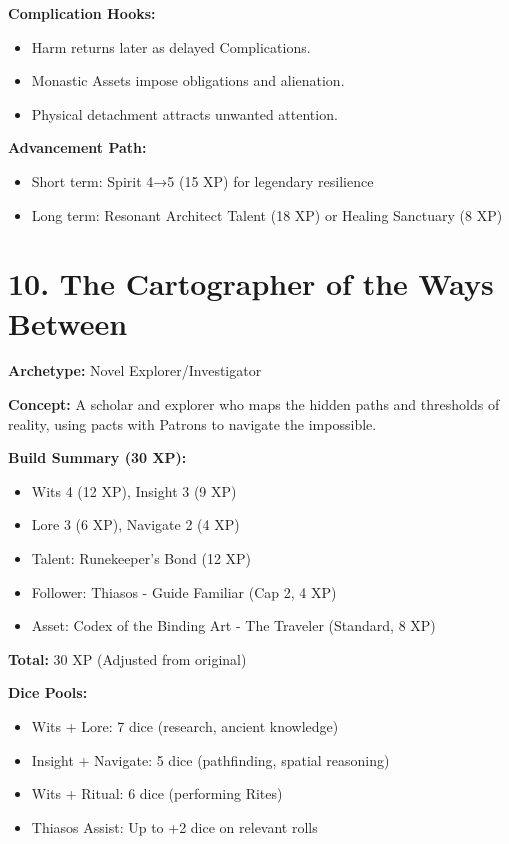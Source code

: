 \textbf{Complication Hooks:}
\begin{itemize}
  \item Harm returns later as delayed Complications.
  \item Monastic Assets impose obligations and alienation.
  \item Physical detachment attracts unwanted attention.
\end{itemize}

\textbf{Advancement Path:}
\begin{itemize}
  \item Short term: Spirit 4→5 (15 XP) for legendary resilience
  \item Long term: Resonant Architect Talent (18 XP) or Healing Sanctuary (8 XP)
\end{itemize}

\section{10. The Cartographer of the Ways Between}
\textbf{Archetype:} Novel Explorer/Investigator

\textbf{Concept:} A scholar and explorer who maps the hidden paths and thresholds of reality, using pacts with Patrons to navigate the impossible.

\textbf{Build Summary (30 XP):}
\begin{itemize}
  \item Wits 4 (12 XP), Insight 3 (9 XP)
  \item Lore 3 (6 XP), Navigate 2 (4 XP) %
  \item Talent: Runekeeper's Bond (12 XP)
  \item Follower: Thiasos - Guide Familiar (Cap 2, 4 XP)
  \item Asset: Codex of the Binding Art - The Traveler (Standard, 8 XP)
\end{itemize}
\textbf{Total:} 30 XP (Adjusted from original)

\textbf{Dice Pools:}
\begin{itemize}
  \item Wits + Lore: 7 dice (research, ancient knowledge)
  \item Insight + Navigate: 5 dice (pathfinding, spatial reasoning)
  \item Wits + Ritual: 6 dice (performing Rites)
  \item Thiasos Assist: Up to +2 dice on relevant rolls
\end{itemize}

